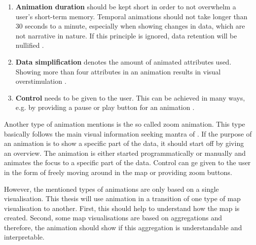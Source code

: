 \begin{enumerate}

\item \textbf{Animation duration} should be kept short in order to not overwhelm a user's short-term memory. Temporal animations should not take longer than 30 seconds to a minute, especially when showing changes in data, which are not narrative in nature. If this principle is ignored, data retention will be nullified .

\item \textbf{Data simplification} denotes the amount of animated attributes used. Showing more than four attributes in an animation results in visual overstimulation .

\item \textbf{Control} needs to be given to the user. This can be achieved in many ways, e.g. by providing a pause or play button for an animation .

\end{enumerate}

Another type of animation \citeauthor{Muehlenhaus2014} mentions is the so called zoom animation. This type basically follows the main visual information seeking mantra of \citeauthor{Shneiderman1996}. If the purpose of an animation is to show a specific part of the data, it should start off by giving an overview. The animation is either started programmatically or manually and animates the focus to a specific part of the data. Control can ge given to the user in the form of freely moving around in the map or providing zoom buttons.

However, the mentioned types of animations are only based on a single visualisation. This thesis will use animation in a transition of one type of map visualisation to another. First, this should help to understand how the map is created. Second, some map visualisations are based on aggregations and therefore, the animation should show if this aggregation is understandable and interpretable.